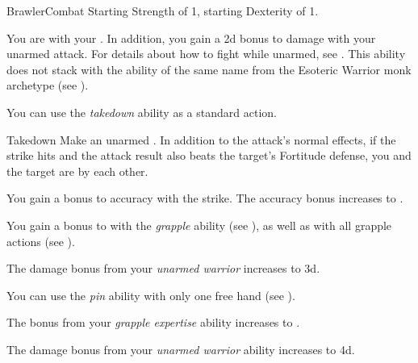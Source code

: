     \begin{feat}{Brawler}{Combat}
        \featpre Starting Strength of 1, starting Dexterity of 1.

         You are  with your .
        In addition, you gain a \plus2d bonus to damage with your unarmed attack.
        For details about how to fight while unarmed, see .
        This ability does not stack with the ability of the same name from the Esoteric Warrior monk archetype (see ).

         You can use the \textit{takedown} ability as a standard action.
        \begin{freeability}{Takedown}
            Make an unarmed .
            In addition to the attack's normal effects, if the strike hits and the attack result also beats the target's Fortitude defense, you and the target are \grappled by each other.

            \rankline
             You gain a  bonus to accuracy with the strike.
             The accuracy bonus increases to .
        \end{freeability}

         You gain a  bonus to  with the \textit{grapple} ability (see ), as well as with all grapple actions (see ).

         The damage bonus from your \textit{unarmed warrior} increases to \plus3d.

         You can use the \textit{pin} ability with only one free hand (see ).

         The bonus from your \textit{grapple expertise} ability increases to .

         The damage bonus from your \textit{unarmed warrior} ability increases to \plus4d.
    \end{feat}

